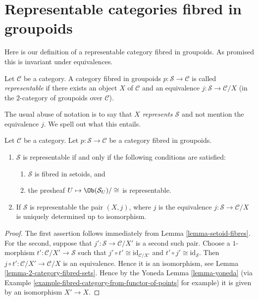 \section{Representable categories fibred in groupoids}
\label{section-representable-fibred-groupoids}

\noindent
Here is our definition of a representable category fibred in groupoids.
As promised this is invariant under equivalences.

\begin{definition}
\label{definition-representable-fibred-category}
Let $\mathcal{C}$ be a category.
A category fibred in groupoids $p : \mathcal{S} \to \mathcal{C}$ is
called {\it representable} if there exists an object
$X$ of $\mathcal{C}$ and an equivalence $j : \mathcal{S} \to \mathcal{C}/X$
(in the $2$-category of groupoids over $\mathcal{C}$).
\end{definition}

\noindent
The usual abuse of notation is to say that {\it $X$ represents $\mathcal{S}$}
and not mention the equivalence $j$. We spell out what this entails.

\begin{lemma}
\label{lemma-characterize-representable-fibred-category}
Let $\mathcal{C}$ be a category.
Let $p : \mathcal{S} \to \mathcal{C}$ be a category fibred in groupoids.
\begin{enumerate}
\item $\mathcal{S}$ is representable if and only if
the following conditions are satisfied:
\begin{enumerate}
\item $\mathcal{S}$ is fibred in setoids, and
\item the presheaf $U \mapsto \Ob(\mathcal{S}_U)/\cong$ is
representable.
\end{enumerate}
\item If $\mathcal{S}$ is representable the pair $(X, j)$, where $j$ is the
equivalence $j : \mathcal{S} \to \mathcal{C}/X$ is uniquely determined
up to isomorphism.
\end{enumerate}
\end{lemma}

\begin{proof}
The first assertion follows immediately from
Lemma \ref{lemma-setoid-fibres}.
For the second, suppose that $j' : \mathcal{S} \to \mathcal{C}/X'$ is
a second such pair. Choose a $1$-morphism
$t' : \mathcal{C}/X' \to \mathcal{S}$ such that
$j' \circ t' \cong \text{id}_{\mathcal{C}/X'}$ and
$t' \circ j' \cong \text{id}_\mathcal{S}$. Then
$j \circ t' : \mathcal{C}/X' \to \mathcal{C}/X$ is an equivalence.
Hence it is an isomorphism, see Lemma \ref{lemma-2-category-fibred-sets}.
Hence by the Yoneda Lemma \ref{lemma-yoneda} (via
Example \ref{example-fibred-category-from-functor-of-points} for example)
it is given by an isomorphism $X' \to X$.
\end{proof}

